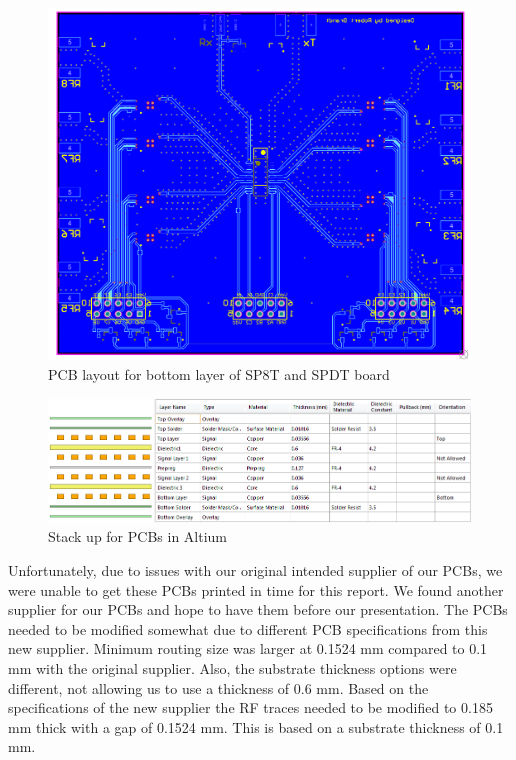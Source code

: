 \begin{figure}[h]
	\begin{center}
		\includegraphics[width=5.5in]{./images/sp8t_bottom.png}
		\caption{PCB layout for bottom layer of SP8T and SPDT board}
		\label{fig:sp8t_bottom}
	\end{center}
\end{figure}

\begin{figure}[h]
	\begin{center}
		\includegraphics[width=5in]{./images/stackup.png}
		\caption{Stack up for PCBs in Altium}
		\label{fig:stackup}
	\end{center}
\end{figure}


Unfortunately, due to issues with our original intended supplier of our PCBs, we were unable to get these PCBs printed in time for this report. We found another supplier for our PCBs and hope to have them before our presentation. The PCBs needed to be modified somewhat due to different PCB specifications from this new supplier. Minimum routing size was larger at 0.1524 mm compared to 0.1 mm with the original supplier. Also, the substrate thickness options were different, not allowing us to use a thickness of 0.6 mm. Based on the specifications of the new supplier the RF traces needed to be modified to 0.185 mm thick with a gap of 0.1524 mm. This is based on a substrate thickness of 0.1 mm.


